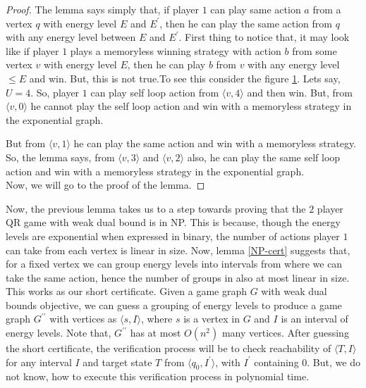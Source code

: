 \begin{proof}
The lemma says simply that, if player $1$ can play same action $a$ from a vertex $q$ with energy level $E$ and $E^{\prime}$, then he can play the same action from $q$ with any energy level between $E$ and $E^{\prime}$. First thing to notice that, it may look like if player $1$ plays a memoryless winning strategy with action $b$ from some vertex $v$ with energy level $E$, then he can play $b$ from $v$ with any energy level $\leq E$ and win. But, this is not true.To see this consider the figure \ref{not_true}. Lets say, $U=4$. So, player $1$ can play self loop action from $\langle v,4 \rangle$ and then win. But, from $\langle v,0 \rangle$ he cannot play the self loop action and win with a memoryless strategy in the exponential graph.\\
\begin{figure}[htb]
\hskip 6cm
\label{not_true}

\end{figure}
But from $\langle v,1 \rangle$ he can play the same action and win with a memoryless strategy. So, the lemma says, from $\langle v,3 \rangle$ and $\langle v,2 \rangle$ also, he can play the same self loop action and win with a memoryless strategy in the exponential graph.\\
Now, we will go to the proof of the lemma. 
\end{proof}
\vskip 0.5cm
Now, the previous lemma takes us to a step towards proving that the $2$ player QR game with weak dual bound is in NP. This is because, though the energy levels are exponential when expressed in binary, the number of actions player $1$ can take from each vertex is linear in size. Now, lemma \ref{NP-cert} suggests that, for a fixed vertex we can group energy levels into intervals from where we can take the same action, hence the number of groups in also at most linear in size.\\
This works as our short certificate. Given a game graph $G$ with weak dual bounds objective, we can guess a grouping of energy levels to produce a game graph $G^{\prime \prime}$ with vertices as $\langle s, I\rangle$, where $s$ is a vertex in $G$ and $I$ is an interval of energy levels. Note that, $G^{\prime \prime}$ has at most $O(n^2)$ many vertices. After guessing the short certificate, the verification process will be to check reachability of $\langle T, I\rangle$ for any interval $I$ and target state $T$ from $\langle q_0, I^{\prime} \rangle$, with $I^{\prime}$ containing 0. But, we do not know, how to execute this verification process in polynomial time. 
